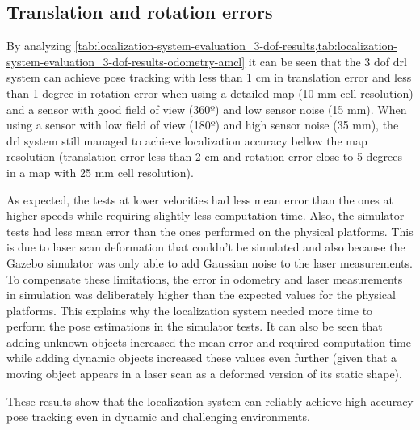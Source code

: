 \subsection{Translation and rotation errors}

By analyzing \cref{tab:localization-system-evaluation_3-dof-results,tab:localization-system-evaluation_3-dof-results-odometry-amcl} it can be seen that the 3 \gls{dof} \gls{drl} system can achieve pose tracking with less than 1 cm in translation error and less than 1 degree in rotation error when using a detailed map (10 mm cell resolution) and a sensor with good field of view (360º) and low sensor noise (15 mm). When using a sensor with low field of view (180º) and high sensor noise (35 mm), the \gls{drl} system still managed to achieve localization accuracy bellow the map resolution (translation error less than 2 cm and rotation error close to 5 degrees in a map with 25 mm cell resolution).

As expected, the tests at lower velocities had less mean error than the ones at higher speeds while requiring slightly less computation time. Also, the simulator tests had less mean error than the ones performed on the physical platforms. This is due to laser scan deformation that couldn't be simulated and also because the Gazebo simulator was only able to add Gaussian noise to the laser measurements. To compensate these limitations, the error in odometry and laser measurements in simulation was deliberately higher than the expected values for the physical platforms. This explains why the localization system needed more time to perform the pose estimations in the simulator tests. It can also be seen that adding unknown objects increased the mean error and required computation time while adding dynamic objects increased these values even further (given that a moving object appears in a laser scan as a deformed version of its static shape).

These results show that the localization system can reliably achieve high accuracy pose tracking even in dynamic and challenging environments.

